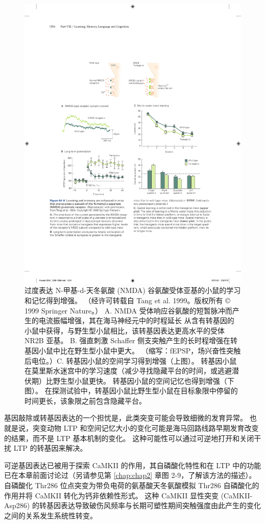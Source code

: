 \begin{figure}[htbp]
	\centering
	\includegraphics[width=0.75\linewidth]{chap54/fig_54_8}
	\caption{过度表达 N-甲基-d-天冬氨酸 (NMDA) 谷氨酸受体亚基的小鼠的学习和记忆得到增强。 （经许可转载自 Tang et al. 1999。版权所有 © 1999 Springer Nature。） A. NMDA 受体响应谷氨酸的短暂脉冲而产生的电流振幅增强，其在海马神经元中的时程延长 从含有转基因的小鼠中获得，与野生型小鼠相比，该转基因表达更高水平的受体 NR2B 亚基。 B. 强直刺激 Schaffer 侧支突触产生的长时程增强在转基因小鼠中比在野生型小鼠中更大。 （缩写：fEPSP，场兴奋性突触后电位。）C. 转基因小鼠的空间学习得到增强（上图）。 转基因小鼠在莫里斯水迷宫中的学习速度（减少寻找隐藏平台的时间，或逃避潜伏期）比野生型小鼠更快。 转基因小鼠的空间记忆也得到增强（下图）。 在探测试验中，转基因小鼠比野生型小鼠在目标象限中停留的时间更长，该象限之前包含隐藏平台。}
	\label{fig:54_8}
\end{figure}

基因敲除或转基因表达的一个担忧是，此类突变可能会导致细微的发育异常。 也就是说，突变动物 LTP 和空间记忆大小的变化可能是海马回路线路早期发育改变的结果，而不是 LTP 基本机制的变化。 这种可能性可以通过可逆地打开和关闭干扰 LTP 的转基因来解决。

可逆基因表达已被用于探索 CaMKII 的作用，其自磷酸化特性和在 LTP 中的功能已在本章前面讨论过（另请参见第 \ref{chap:chap2} 章图 2-9，了解该方法的描述）。 自磷酸化 Thr286 位点突变为带负电荷的氨基酸天冬氨酸模拟 Thr286 自磷酸化的作用并将 CaMKII 转化为钙非依赖性形式。 这种 CaMKII 显性突变 (CaMKII-Asp286) 的转基因表达导致破伤风频率与长期可塑性期间突触强度由此产生的变化之间的关系发生系统性转变。

